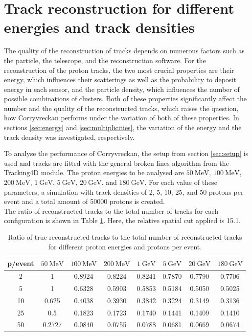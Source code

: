 \section{Track reconstruction for different energies and track densities}
The quality of the reconstruction of tracks depends on numerous factors such as the particle, the telescope, and the reconstruction software.
For the reconstruction of the proton tracks, the two most crucial properties are their energy, which influences their scatterings as well as the probability to deposit
energy in each sensor, and the particle density, which influences the number of possible combinations of clusters.
Both of these properties significantly affect the number and the quality of the reconstructed tracks, which raises the question, how Corryvreckan performs
under the variation of both of these properties.
In sections \ref{sec:energy} and \ref{sec:multiplicities}, the variation of the energy and the track density was investigated, respectively.

To analyse the performance of Corryvreckan, the setup from section \ref{sec:setup} is used and tracks are fitted with the general broken lines algorithm
from the Tracking4D module.
The proton energies to be analysed are $\SI{50}{\mega\eV}$, $\SI{100}{\mega\eV}$, $\SI{200}{\mega\eV}$,
$\SI{1}{\giga\eV}$, $\SI{5}{\giga\eV}$, $\SI{20}{\giga\eV}$, and $\SI{180}{\giga\eV}$. For each value of these parameters, a simulation with track densities
of 2, 5, 10, 25, and 50 protons per event and a total amount of 50000 protons is created. \\
The ratio of reconstructed tracks to the total number of tracks for each configuration is shown in Table \ref{tab:study}. Here, the relative spatial cut applied is 15.1.


\begin{table}
  \centering
  \caption{Ratio of true reconstructed tracks to the total number of reconstructed tracks for different proton energies and protons per event.}
  \begin{tabular}{c | c c c c c c c}
    \toprule
     p/event &  $\SI{50}{\mega\eV}$ & $\SI{100}{\mega\eV}$ & $\SI{200}{\mega\eV}$ & $\SI{1}{\giga\eV}$ & $\SI{5}{\giga\eV}$ & $\SI{20}{\giga\eV}$ & $\SI{180}{\giga\eV}$ \\
    \midrule
     2   & 1 & 0.8924 & 0.8224 & 0.8241 & 0.7870 & 0.7790 & 0.7706  \\
     5   & 1 & 0.6328 & 0.5903 & 0.5853 & 0.5184 & 0.5050 & 0.5025  \\
     10  & 0.625 & 0.4038 & 0.3930 & 0.3842 & 0.3224 & 0.3149 & 0.3136  \\
     25  & 0.5 & 0.1823 & 0.1723 & 0.1740 & 0.1441 & 0.1409 & 0.1410  \\
     50  & 0.2727 & 0.0840 & 0.0755 & 0.0788 & 0.0681 & 0.0669 & 0.0674  \\
  \end{tabular}
  \label{tab:study}
\end{table}

